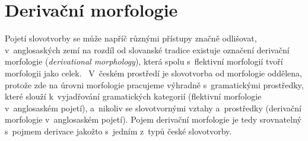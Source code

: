 \hypertarget{derivaux10dnuxed-morfologie}{%
\section{Derivační morfologie}\label{derivaux10dnuxed-morfologie}}

Pojetí slovotvorby se může napříč různými přístupy značně odlišovat,
v~anglosaských zemí na rozdíl od slovanské tradice existuje označení
derivační morfologie (\emph{derivational morphology}), která spolu
s~flektivní morfologií tvoří morfologii jako celek.~\parencite{lieber14}
V~českém prostředí je slovotvorba od morfologie oddělena, protože zde na
úrovni morfologie pracujeme výhradně s~gramatickými prostředky, které
slouží k~vyjadřování gramatických kategorií (flektivní morfologie
v~anglosaském pojetí), a~nikoliv se slovotvornými vztahy a~prostředky
(derivační morfologie v~anglosaském pojetí). Pojem derivační morfologie
je tedy srovnatelný s~pojmem derivace jakožto s~jedním z~typů české
slovotvorby.
